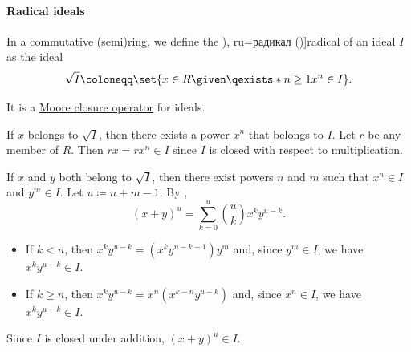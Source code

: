 \paragraph{Radical ideals}

\begin{definition}\label{def:radical_of_ideal}
  In a \hyperref[def:ring/commutative]{commutative (semi)ring}, we define the \term[bg=радикал (\cite[15]{КоцевСидеров2016КомутативнаАлгебра}), ru=радикал (\cite[173]{Ленг1968Алгебра})]{radical} of an ideal \( I \) as the ideal
  \begin{equation}\label{eq:def:radical_ideal}
    \sqrt I \coloneqq \set{ x \in R \given \qexists* {n \geq 1} x^n \in I }.
  \end{equation}

  It is a \hyperref[def:moore_closure_operator]{Moore closure operator} for ideals.
\end{definition}
\begin{defproof}

   If \( x \) belongs to \( \sqrt I \), then there exists a power \( x^n \) that belongs to \( I \). Let \( r \) be any member of \( R \). Then \( rx = rx^n \in I \) since \( I \) is closed with respect to multiplication.

   If \( x \) and \( y \) both belong to \( \sqrt I \), then there exist powers \( n \) and \( m \) such that \( x^n \in I \) and \( y^m \in I \). Let \( u \coloneqq n + m - 1 \). By ,
  \begin{equation*}
    (x + y)^u = \sum_{k=0}^u \binom u k x^k y^{u-k}.
  \end{equation*}

  \begin{itemize}
    \item If \( k < n \), then \( x^k y^{u-k} = (x^k y^{n - k - 1}) y^m \) and, since \( y^m \in I \), we have \( x^k y^{u-k} \in I \).
    \item If \( k \geq n \), then \( x^k y^{u-k} = x^n (x^{k-n} y^{u-k}) \) and, since \( x^n \in I \), we have \( x^k y^{u-k} \in I \).
  \end{itemize}

  Since \( I \) is closed under addition, \( (x + y)^u \in I \).
\end{defproof}

